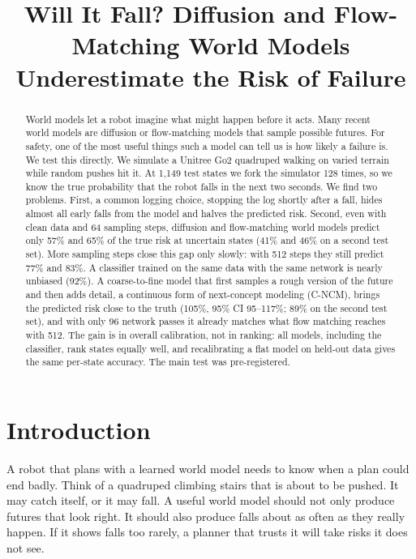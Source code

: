 \documentclass[conference]{IEEEtran}
\title{Will It Fall? Diffusion and Flow-Matching World Models Underestimate the Risk of Failure}
\author{\IEEEauthorblockN{Anonymous Authors}}
\newcommand{\cncm}{C-NCM}
\begin{document}
\maketitle

\begin{abstract}
World models let a robot imagine what might happen before it acts. Many recent world
models are diffusion or flow-matching models that sample possible futures. For safety,
one of the most useful things such a model can tell us is how likely a failure is. We
test this directly. We simulate a Unitree Go2 quadruped walking on varied terrain while
random pushes hit it. At 1,149 test states we fork the simulator 128 times, so we know
the true probability that the robot falls in the next two seconds. We find two problems.
First, a common logging choice, stopping the log shortly after a fall, hides almost all
early falls from the model and halves the predicted risk. Second, even with clean data and
64 sampling steps, diffusion and flow-matching world models predict only 57\% and 65\% of
the true risk at uncertain states (41\% and 46\% on a second test set). More sampling steps
close this gap only slowly: with 512 steps they still predict 77\% and 83\%. A classifier
trained on the same data with the same network is nearly unbiased (92\%). A coarse-to-fine
model that first samples a rough version of the future and then adds detail, a continuous
form of next-concept modeling (\cncm{}), brings the predicted risk close to the truth (105\%,
95\% CI 95--117\%; 89\% on the second test set), and with only 96 network passes it already
matches what flow matching reaches with 512. The gain is in overall calibration, not in
ranking: all models, including the classifier, rank states equally well, and recalibrating
a flat model on held-out data gives the same per-state accuracy. The main test was
pre-registered.
\end{abstract}

\section{Introduction}

A robot that plans with a learned world model needs to know when a plan could end badly.
Think of a quadruped climbing stairs that is about to be pushed. It may catch itself, or
it may fall. A useful world model should not only produce futures that look right. It
should also produce falls about as often as they really happen. If it shows falls too
rarely, a planner that trusts it will take risks it does not see.
\end{document}

